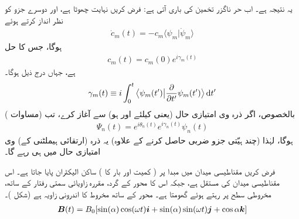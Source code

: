 یہ     نتیجہ ہے۔ اب حر ناگزر تخمین کی باری آتی ہے: فرض کریں  نہایت چھوٹا ہے، اور  دوسرے  جزو  کو نظر انداز کرتے ہوئے 
\begin{align}
\dot{c}_m (t) = - c_m \langle \psi_m | \dot{\psi}_m \rangle
\end{align} 
ہوگا، جس کا حل 
\begin{align}\label{مساوات_حر_سی_ایم}
c_m (t) = c_m (0) e^{i \gamma_m (t)}
\end{align}
ہے، جہاں درج ذیل ہوگا۔
\begin{align}
\gamma_m (t) \equiv  i \int_0^t \big\langle \psi_m (t') \big| \frac{\partial}{\partial t'} \psi_m (t') \big \rangle \dif t'
\end{align}
بالخصوص، اگر ذرہ  وی امتیازی حال  (یعنی  کیلئے  اور  ہو)  سے آغاز کرے،  تب  (مساوات ) 
\begin{align}\label{مساوات_حر_وہیں_رہتا_ہے}
\Psi_n (t) = e^{i \theta_n (t)} e^{i \gamma_n (t)} \psi_n (t)
\end{align}
ہوگا، لہٰذا  (چند  ہیّتی جزو ضربی  حاصل کرنے کے علاوہ)  یہ ذرہ   (ارتقائی  ہیملٹنی کے)   وی امتیازی حال میں ہی رہے گا۔

فرض کریں  مقناطیسی میدان میں مبدا  پر ( کمیت  اور بار  کا )  ساکن  الیکٹران  پایا جاتا ہے۔ اس مقناطیسی میدان کی      مستقل ہے،  جبکہ اس کا     محور کے گرد،    مقررہ زاویائی  سمتی رفتار  کے ساتھ،   مخروطی سطح پر رہتے ہوئے گھومتا ہے۔ محور  کے ساتھ  مخروط کا اندرونی
 زاویہ  ہے  (شکل )۔
\begin{align}\label{مساوات_حر_مخروط_مقناطیسی_میدان}
{\ensuremath{{\boldsymbol{B}}}} (t) = B_0 [\sin(\alpha) \cos(\omega t) {\boldsymbol{i}} + \sin(\alpha) \sin(\omega t) {\boldsymbol{j}} + \cos \alpha {\boldsymbol{k}}]
\end{align}

